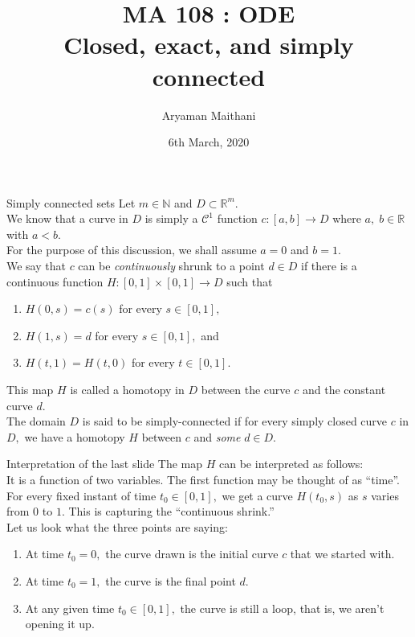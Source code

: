 \documentclass[handout, aspectratio=169]{beamer}
\title{MA 108 : ODE\\ Closed, exact, and simply connected}  %
\author{Aryaman Maithani}
\date[06-03-2019]{6th March, 2020}               %
\institute[IITB]{IIT Bombay}
\begin{document}
\begin{frame}
	\titlepage
\end{frame}
\begin{frame}{Simply connected sets}
	Let $m \in \mathbb{N}$ and $D \subset \mathbb{R}^m.$\\
	We know that a curve in $D$ is simply a $\mathcal{C}^1$ function $c:[a, b]\to D$ where $a,\;b\in\mathbb{R}$ with $a < b.$\\
	For the purpose of this discussion, we shall assume $a = 0$ and $b = 1.$\\
	We say that $c$ can be \emph{continuously} shrunk to a point $d \in D$ if there is a continuous function $H:[0, 1]\times[0, 1]\to D$ such that
	\begin{enumerate} 
		\item $H(0, s) = c(s)$ for every $s \in [0, 1],$
		\item $H(1, s) = d$ for every $s \in [0, 1],$ and
		\item $H(t, 1) = H(t, 0)$ for every $t \in [0, 1].$
	\end{enumerate}
	This map $H$ is called a homotopy in $D$ between the curve $c$ and the constant curve $d.$\\
	The domain $D$ is said to be simply-connected if for every simply closed curve $c$ in $D,$ we have a homotopy $H$ between $c$ and \emph{some} $d \in D.$
\end{frame}
\begin{frame}{Interpretation of the last slide} 
	The map $H$ can be interpreted as follows:\\
	It is a function of two variables. The first function may be thought of as ``time''.\\
	For every fixed instant of time $t_0 \in [0, 1],$ we get a curve $H(t_0, s)$ as $s$ varies from $0$ to $1.$ This is capturing the ``continuous shrink.''\\
	Let us look what the three points are saying:
	\begin{enumerate} 
		\item At time $t_0 = 0,$ the curve drawn is the initial curve $c$ that we started with.
		\item At time $t_0 = 1,$ the curve is the final point $d.$
		\item At any given time $t_0 \in [0, 1],$ the curve is still a loop, that is, we aren't opening it up.
	\end{enumerate}
\end{frame}
\end{document}
